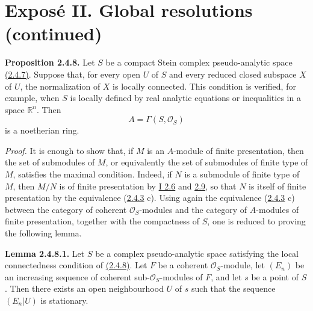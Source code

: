 \section*{Exposé II. Global resolutions (continued)}

\textbf{Proposition 2.4.8.} Let $S$ be a compact Stein complex pseudo-analytic space \hyperlink{sga6.e02.def.2-4-7}{(2.4.7)}. Suppose that, for every open $U$ of $S$ and every reduced closed subspace $X$ of $U$, the normalization of $X$ is locally connected. This condition is verified, for example, when $S$ is locally defined by real analytic equations or inequalities in a space $\mathbb R^n$. Then
\[
 A=\Gamma(S,\mathcal O_S)
\]
is a noetherian ring.

\emph{Proof.} It is enough to show that, if $M$ is an $A$-module of finite presentation, then the set of submodules of $M$, or equivalently the set of submodules of finite type of $M$, satisfies the maximal condition. Indeed, if $N$ is a submodule of finite type of $M$, then $M/N$ is of finite presentation by \hyperlink{sga6.e01.schol.2-6}{I 2.6} and \hyperlink{sga6.e01.prop.2-9}{2.9}, so that $N$ is itself of finite presentation by the equivalence (\hyperlink{sga6.e02.lem.2-4-3}{2.4.3} c). Using again the equivalence (\hyperlink{sga6.e02.lem.2-4-3}{2.4.3} c) between the category of coherent $\mathcal O_S$-modules and the category of $A$-modules of finite presentation, together with the compactness of $S$, one is reduced to proving the following lemma.

\textbf{Lemma 2.4.8.1.} Let $S$ be a complex pseudo-analytic space satisfying the local connectedness condition of \hyperlink{sga6.e02.prop.2-4-8}{(2.4.8)}. Let $F$ be a coherent $\mathcal O_S$-module, let $(E_n)$ be an increasing sequence of coherent sub-$\mathcal O_S$-modules of $F$, and let $s$ be a point of $S$. Then there exists an open neighbourhood $U$ of $s$ such that the sequence $(E_n|U)$ is stationary.

